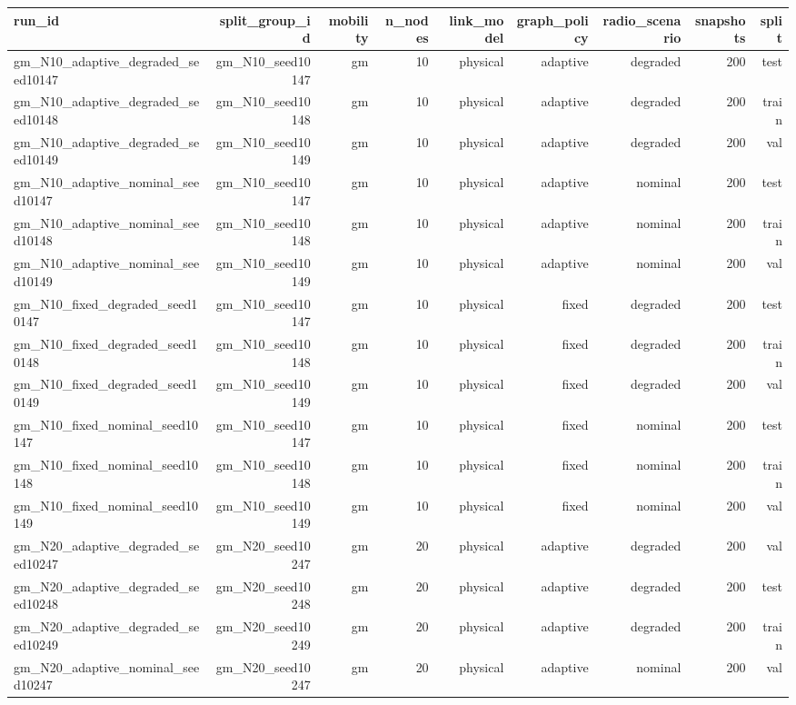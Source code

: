 \begin{tabular}{lrrrrrrrr}
\toprule
run\_id & split\_group\_id & mobility & n\_nodes & link\_model & graph\_policy & radio\_scenario & snapshots & split \\
\midrule
gm\_N10\_adaptive\_degraded\_seed10147 & gm\_N10\_seed10147 & gm & 10 & physical & adaptive & degraded & 200 & test \\
gm\_N10\_adaptive\_degraded\_seed10148 & gm\_N10\_seed10148 & gm & 10 & physical & adaptive & degraded & 200 & train \\
gm\_N10\_adaptive\_degraded\_seed10149 & gm\_N10\_seed10149 & gm & 10 & physical & adaptive & degraded & 200 & val \\
gm\_N10\_adaptive\_nominal\_seed10147 & gm\_N10\_seed10147 & gm & 10 & physical & adaptive & nominal & 200 & test \\
gm\_N10\_adaptive\_nominal\_seed10148 & gm\_N10\_seed10148 & gm & 10 & physical & adaptive & nominal & 200 & train \\
gm\_N10\_adaptive\_nominal\_seed10149 & gm\_N10\_seed10149 & gm & 10 & physical & adaptive & nominal & 200 & val \\
gm\_N10\_fixed\_degraded\_seed10147 & gm\_N10\_seed10147 & gm & 10 & physical & fixed & degraded & 200 & test \\
gm\_N10\_fixed\_degraded\_seed10148 & gm\_N10\_seed10148 & gm & 10 & physical & fixed & degraded & 200 & train \\
gm\_N10\_fixed\_degraded\_seed10149 & gm\_N10\_seed10149 & gm & 10 & physical & fixed & degraded & 200 & val \\
gm\_N10\_fixed\_nominal\_seed10147 & gm\_N10\_seed10147 & gm & 10 & physical & fixed & nominal & 200 & test \\
gm\_N10\_fixed\_nominal\_seed10148 & gm\_N10\_seed10148 & gm & 10 & physical & fixed & nominal & 200 & train \\
gm\_N10\_fixed\_nominal\_seed10149 & gm\_N10\_seed10149 & gm & 10 & physical & fixed & nominal & 200 & val \\
gm\_N20\_adaptive\_degraded\_seed10247 & gm\_N20\_seed10247 & gm & 20 & physical & adaptive & degraded & 200 & val \\
gm\_N20\_adaptive\_degraded\_seed10248 & gm\_N20\_seed10248 & gm & 20 & physical & adaptive & degraded & 200 & test \\
gm\_N20\_adaptive\_degraded\_seed10249 & gm\_N20\_seed10249 & gm & 20 & physical & adaptive & degraded & 200 & train \\
gm\_N20\_adaptive\_nominal\_seed10247 & gm\_N20\_seed10247 & gm & 20 & physical & adaptive & nominal & 200 & val \\

\end{tabular}
